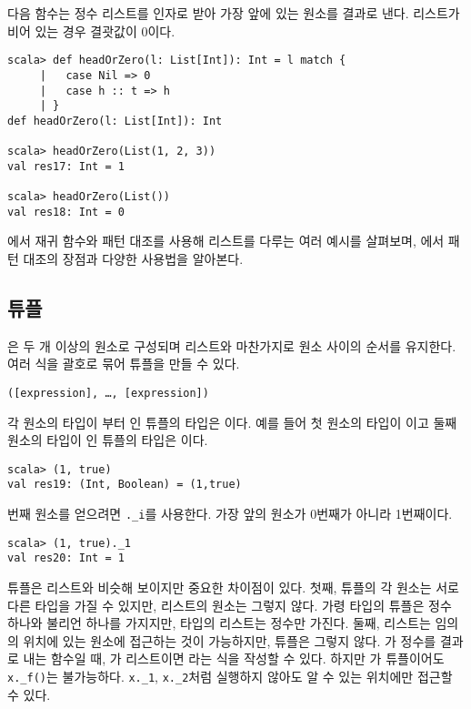 다음 함수는 정수 리스트를 인자로 받아 가장 앞에 있는 원소를 결과로 낸다.
리스트가 비어 있는 경우 결괏값이 0이다.

\begin{verbatim}
scala> def headOrZero(l: List[Int]): Int = l match {
     |   case Nil => 0
     |   case h :: t => h
     | }
def headOrZero(l: List[Int]): Int

scala> headOrZero(List(1, 2, 3))
val res17: Int = 1

scala> headOrZero(List())
val res18: Int = 0
\end{verbatim}

에서 재귀 함수와 패턴 대조를 사용해 리스트를 다루는 여러 예시를 살펴보며,
에서 패턴 대조의 장점과 다양한 사용법을 알아본다.

\subsection{튜플}

은 두 개 이상의 원소로 구성되며 리스트와 마찬가지로 원소 사이의
순서를 유지한다. 여러 식을 괄호로 묶어 튜플을 만들 수 있다.

\begin{verbatim}
([expression], …, [expression])
\end{verbatim}

각 원소의 타입이 부터 인 튜플의 타입은 이다. 예를 들어 첫 원소의
타입이 이고 둘째 원소의 타입이 인 튜플의 타입은
이다.

\begin{verbatim}
scala> (1, true)
val res19: (Int, Boolean) = (1,true)
\end{verbatim}

번째 원소를 얻으려면 \verb!._i!를 사용한다. 가장 앞의 원소가 0번째가 아니라 1번째이다.

\begin{verbatim}
scala> (1, true)._1
val res20: Int = 1
\end{verbatim}

튜플은 리스트와 비슷해 보이지만 중요한 차이점이 있다. 첫째, 튜플의 각 원소는
서로 다른 타입을 가질 수 있지만, 리스트의 원소는 그렇지 않다. 가령  타입의 튜플은 정수 하나와 불리언 하나를 가지지만,  타입의
리스트는 정수만 가진다. 둘째, 리스트는 임의의 위치에 있는 원소에 접근하는 것이
가능하지만, 튜플은 그렇지 않다. 가 정수를 결과로 내는 함수일 때,
가 리스트이면 라는 식을 작성할 수 있다.
하지만 가 튜플이어도 \verb!x._f()!는 불가능하다. \verb!x._1!,
\verb!x._2!처럼 실행하지 않아도 알 수 있는 위치에만 접근할 수 있다.

